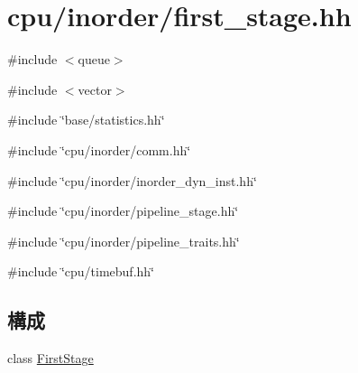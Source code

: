 \hypertarget{first__stage_8hh}{
\section{cpu/inorder/first\_\-stage.hh}
\label{first__stage_8hh}
}
{\ttfamily \#include $<$queue$>$}\par
{\ttfamily \#include $<$vector$>$}\par
{\ttfamily \#include \char`\"{}base/statistics.hh\char`\"{}}\par
{\ttfamily \#include \char`\"{}cpu/inorder/comm.hh\char`\"{}}\par
{\ttfamily \#include \char`\"{}cpu/inorder/inorder\_\-dyn\_\-inst.hh\char`\"{}}\par
{\ttfamily \#include \char`\"{}cpu/inorder/pipeline\_\-stage.hh\char`\"{}}\par
{\ttfamily \#include \char`\"{}cpu/inorder/pipeline\_\-traits.hh\char`\"{}}\par
{\ttfamily \#include \char`\"{}cpu/timebuf.hh\char`\"{}}\par
\subsection*{構成}
\begin{DoxyCompactItemize}
\item 
class \hyperlink{classFirstStage}{FirstStage}
\end{DoxyCompactItemize}

